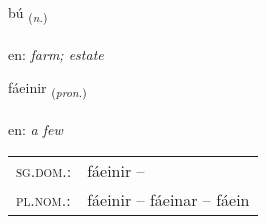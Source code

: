 \documentclass[frontgrid, backgrid]{flacards}\usepackage[]{graphicx}\usepackage[]{color}
\begin{document}
\renewcommand{\flhead}{\vskip5pt \fboxsep=0pt {\small\bfseries\footnotesize Nafnorð | Noun}}
\renewcommand{\fcfoot}{\vskip5pt \fboxsep=0pt \hspace{2pt}{\small\bfseries\footnotesize 2K}}

\renewcommand{\blhead}{\vskip5pt {\small\bfseries\footnotesize Nafnorð | Noun }}
\renewcommand{\bcfoot}{\vskip5pt \hspace{2pt}{\small\bfseries\footnotesize 2K}}


{bú \small{\textsubscript{(\textit{n.})}} \\[1ex] %
\textphonetic{[puː]} \\
en: \emph{farm; estate} \\  [2ex]
\renewcommand*{\arraystretch}{0.8}
}

\renewcommand{\flhead}{\vskip5pt \fboxsep=0pt {\small\bfseries\footnotesize Fornafn | Pronoun}}
\renewcommand{\fcfoot}{\vskip5pt \fboxsep=0pt \hspace{2pt}{\small\bfseries\footnotesize 2K}}

\renewcommand{\blhead}{\vskip5pt {\small\bfseries\footnotesize Fornafn | Pronoun }}
\renewcommand{\bcfoot}{\vskip5pt \hspace{2pt}{\small\bfseries\footnotesize 2K}}


{fáeinir \small{\textsubscript{(\textit{pron.})}} \\[1ex] %
\textphonetic{[fauːeinɪr]} \\
en: \emph{a few} \\  [2ex]
\renewcommand*{\arraystretch}{0.8}
\begin{tabular}{ll}
\textsc{sg.dom.}: & fáeinir  -- \\ 
\textsc{pl.nom.}: & fáeinir -- fáeinar -- fáein
\end{tabular}
}
\end{document}
